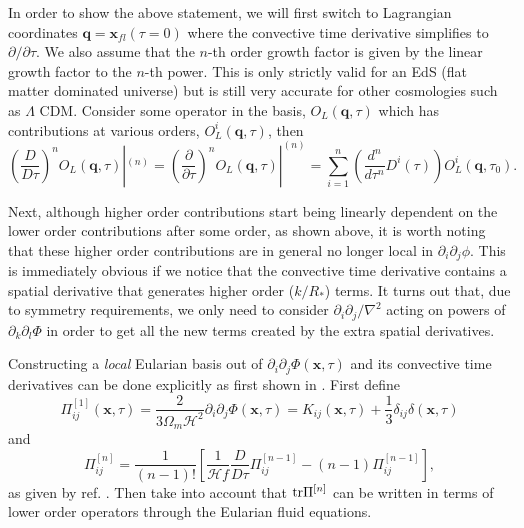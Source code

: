 \documentclass[11pt]{article}
\DeclareRobustCommand{\tr}{\ifmmode\text{tr}\else d\fi}
\newcommand{\br}[1]{\ensuremath{\left( #1 \right)}}
\newcommand{\sbr}[1]{\ensuremath{\left[ #1 \right]}}
\begin{document}
In order to show the above statement, we will first switch to Lagrangian coordinates $\mathbf q = \mathbf x_{fl}(\tau=0)$ where the convective time derivative simplifies to $\partial/\partial \tau$. We also assume that the $n$-th order growth factor is given by the linear growth factor to the $n$-th power. This is only strictly valid for an EdS (flat matter dominated universe) but is still very accurate for other cosmologies such as $\Lambda$ CDM. %
Consider some operator in the basis, $O_L(\mathbf q, \tau)$ which has contributions at various orders, $O_L^i(\mathbf q, \tau)$, then
\begin{equation}
    \br{\frac{D}{D\tau}}^n O_L(\mathbf q, \tau)|^{(n)} = \br{\frac{\partial}{\partial\tau}}^n O_L(\mathbf q, \tau)|^{(n)} = \sum_{i = 1}^n \br{\frac{d^n}{d\tau^n}D^i(\tau)}O^{i}_{L}(\mathbf q, \tau_0).
\end{equation}

Next, although higher order contributions start being linearly dependent on the lower order contributions after some order, as shown above, it is worth noting that these higher order contributions are in general no longer local in $\partial_i\partial_j \phi$. This is immediately obvious if we notice that the convective time derivative contains a spatial derivative that generates higher order ($k/R_*$) terms. It turns out that, due to symmetry requirements, we only need to consider $\partial_i \partial_j / \nabla ^2$ acting on powers of $\partial_k \partial_l \Phi$ in order to get all the new terms created by the extra spatial derivatives. %

Constructing a \emph{local} Eularian basis out of $\partial_i\partial_j\Phi(\mathbf x, \tau)$ and its convective time derivatives can be done explicitly as first shown in \cite{Mirbabayi_2015}. First define
\begin{equation}
    \Pi^{[1]}_{ij}(\mathbf x, \tau) = \frac{2}{3\Omega_m\mathcal H^2}\partial_i\partial_j\Phi(\mathbf x, \tau) = K_{ij}(\mathbf x, \tau) + \frac{1}{3}\delta_{ij}\delta(\mathbf x, \tau)
\end{equation}
and
\begin{equation}
    \Pi^{[n]}_{ij} = \frac{1}{(n-1)!}\sbr{ \frac{1}{\mathcal H f}\frac{D}{D\tau} \Pi^{[n-1]}_{ij} - (n-1)\Pi^{[n-1]}_{ij}},
\end{equation}
as given by ref. \cite{Mirbabayi_2015}. Then take into account that $\tr \Pi^{[n]}$ can be written in terms of lower order operators through the Eularian fluid equations. %
\end{document}
